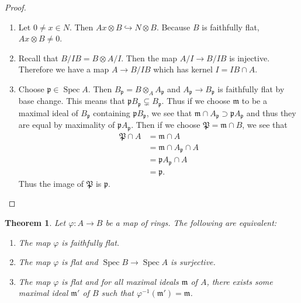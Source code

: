 \documentclass[leqno, openany]{memoir}
\newtheorem{thm}{Theorem}[section]
\theoremstyle{definition}
\theoremstyle{remark}
\theoremstyle{plain}
\theoremstyle{definition}
\theoremstyle{remark}
\newcommand{\mf}[1]{\mathfrak{#1}}
\DeclareMathOperator{\Spec}{Spec}
\begin{document}
\begin{proof}
    \begin{enumerate}
        \item Let $0 \neq x \in N$. Then $Ax \otimes B \hookrightarrow N \otimes B$. Because $B$ is faithfully flat, $Ax \otimes B \neq 0$.
        \item Recall that $B/IB = B \otimes A/I$. Then the map $A/I \to B/IB$ is injective. Therefore we have a map $A \to B/IB$ which has kernel $I = IB \cap A$.
        \item Choose $\mf{p} \in \Spec A$. Then $B_{\mf{p}} = B \otimes_A A_{\mf{p}}$ and $A_{\mf{p}} \to B_{\mf{p}}$ is faithfully flat by base change. This means that $\mf{p} B_{\mf{p}} \subsetneq B_{\mf{p}}$. Thus if we choose $\mf{m}$ to be a maximal ideal of $B_{\mf{p}}$ containing $\mf{p} B_{\mf{p}}$, we see that $\mf{m} \cap A_{\mf{p}} \supset \mf{p}A_{\mf{p}}$ and thus they are equal by maximality of $\mf{p}A_{\mf{p}}$. Then if we choose $\mf{P} = \mf{m} \cap B$, we see that 
            \begin{align*}
                \mf{P} \cap A &= \mf{m} \cap A \\
                              &= \mf{m} \cap A_{\mf{p}} \cap A \\
                              &= \mf{p} A_{\mf{p}} \cap A \\
                              &= \mf{p}.
            \end{align*}
            Thus the image of $\mf{P}$ is $\mf{p}$. \qedhere
    \end{enumerate}
\end{proof}

\begin{thm}
    Let $\varphi: A \to B$ be a map of rings. The following are equivalent:
    \begin{enumerate}
        \item The map $\varphi$ is faithfully flat.
        \item The map $\varphi$ is flat and $\Spec B \to \Spec A$ is surjective.
        \item The map $\varphi$ is flat and for all maximal ideals $\mf{m}$ of $A$, there exists some maximal ideal $\mf{m}'$ of $B$ such that $\varphi^{-1}(\mf{m}') = \mf{m}$.
    \end{enumerate}
\end{thm}
\end{document}
